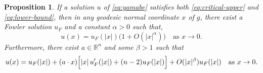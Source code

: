 \documentclass[11pt]{article}
\numberwithin{equation}{section}
\newtheorem{proposition}[theorem]{Proposition}
\theoremstyle{remark}
\begin{document}
\begin{proposition}\label{prop:fowler-asymptotics}
If a solution $u$ of \eqref{eq:yamabe} satisfies both \eqref{eq:critical-upper} and \eqref{eq:lower-bound}, then in any geodesic normal coordinate $x$ of $g$, there exist a Fowler
solution \(u_F\) and a constant \(\alpha>0\) such that, 
\begin{equation}\label{eq:fowler-asymptotic}
 u(x)=u_F(|x|)\bigl(1+O(|x|^\alpha)\bigr)
 \quad\text{as }x\to0.
\end{equation}
Furthermore, there exist $a\in \mathbb{R}^n$ and
some $\beta>1$ such that
\begin{equation}\label{eq:fowler-asymptotic-order1}
 u(x)=u_F(|x|)
+
(a\cdot x)\Bigl[|x|\,u_F'(|x|)+(n-2)u_F(|x|)\Bigr]
+
O(|x|^\beta)u_F(|x|)
 \quad\text{as }x\to0.
\end{equation}
\end{proposition}
\end{document}
